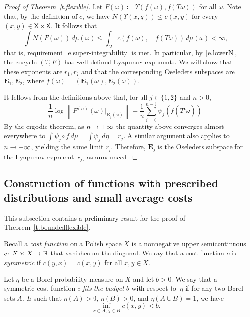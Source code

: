 \documentclass[10pt]{amsart}
\theoremstyle{definition}\newtheorem{defi}[theo]{Definition}\newtheorem{rema}[theo]{Remark}\newtheorem{exam}[theo]{Example}\newtheorem{exem}[theo]{Example}\newtheorem{nota}[theo]{Notation}
\newcommand{\R}{\mathbb{R}}
\newcommand{\E}{\mathbf{E}}
\newcommand{\sfX}{\mathsf{X}}
\renewcommand*{\to}{\mathchoice{\longrightarrow}{\rightarrow}{\rightarrow}{\rightarrow}}
\begin{document}
\begin{proof}[Proof of Theorem~\ref{t.flexible}]
Let $F(\omega) \coloneqq \Upsilon(f(\omega),f(T \omega))$ for all $\omega$. Note that, by the definition of $c$, we have $N(\Upsilon(x,y)) \le c(x,y)$ for every $(x,y) \in \sfX \times \sfX$. It follows that
\begin{equation}
\int N(F(\omega)) \, d\mu(\omega) \le \int_\Omega c(f(\omega),\quad f(T \omega)) \, d\mu(\omega) < \infty,
\end{equation}
that is, requirement~\eqref{e.super-integrability} is met. In particular, by~\eqref{e.lowerN}, the cocycle $(T,F)$ has well-defined Lyapunov exponents. We will show that these exponents are $r_1, r_2$ and that the corresponding Oseledets subspaces are $\E_1,\E_2$, where $f(\omega) = (\E_1(\omega),\E_2(\omega))$.

It follows from the definitions above that, for all $j \in \{1,2\}$ and $n>0$,
\begin{equation}
\frac{1}{n}\log \left\|F^{(n)}(\omega)|_{ \E_j(\omega)}\right\| =
\frac{1}{n} \sum_{i = 0}^{n-1} \psi_j\left(f(T^i \omega)\right).
\end{equation}
By the ergodic theorem, as $n \to +\infty$ the quantity above converges almost everywhere to $\int \psi_j \circ f \, d\mu = \int \psi_j \, d\eta = r_j$. A similar argument also applies to $n \to -\infty$, yielding the same limit $r_j$. Therefore, $\E_j$ is the Oseledets subspace for the Lyapunov exponent~$r_j$, as announced.
\end{proof}


\subsection{Construction of functions with prescribed distributions and small average costs}

This subsection contains a preliminary result for the proof of Theorem~\ref{t.boundedflexible}.

Recall a \emph{cost function} on a Polish space $X$ is a nonnegative upper semicontinuous $c \colon X \times X \to \R$ that vanishes on the diagonal. We say that a cost function $c$ is \emph{symmetric} if $c(y,x) = c(x,y)$ for all $x,y \in X$.

Let $\eta$ be a Borel probability measure on $X$ and let $b>0$. We say that a symmetric cost function $c$ \emph{fits the budget $b$} with respect to~$\eta$ if for any two Borel sets $A$, $B$ such that $\eta(A)>0$, $\eta(B)>0$, and $\eta(A \cup B) = 1$, we have
\begin{equation}
\inf_{x \in A, \, y \in B} c(x,y) < b.
\end{equation}
\end{document}
